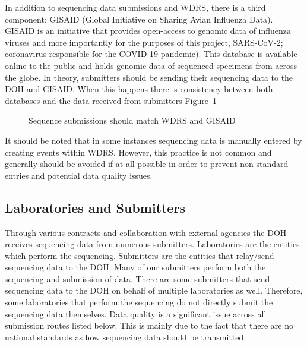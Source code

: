 \documentclass[
  letterpaper,
  DIV=11,
  numbers=noendperiod]{scrartcl}
\begin{document}
In addition to sequencing data submissions and WDRS, there is a third
component; GISAID (Global Initiative on Sharing Avian Influenza Data).
GISAID is an initiative that provides open-access to genomic data of
influenza viruses and more importantly for the purposes of this project,
SARS-CoV-2; coronavirus responsible for the COVID-19 pandemic). This
database is available online to the public and holds genomic data of
sequenced specimens from across the globe. In theory, submitters should
be sending their sequencing data to the DOH and GISAID. When this
happens there is consistency between both databases and the data
received from submitters Figure~\ref{fig-gisaid}

\begin{figure}[H]


\caption{\label{fig-gisaid}Sequence submissions should match WDRS and
GISAID}

\end{figure}%

It should be noted that in some instances sequencing data is manually
entered by creating events within WDRS. However, this practice is not
common and generally should be avoided if at all possible in order to
prevent non-standard entries and potential data quality issues.

\subsection{Laboratories and
Submitters}\label{laboratories-and-submitters}

Through various contracts and collaboration with external agencies the
DOH receives sequencing data from numerous submitters. Laboratories are
the entities which perform the sequencing. Submitters are the entities
that relay/send sequencing data to the DOH. Many of our submitters
perform both the sequencing and submission of data. There are some
submitters that send sequencing data to the DOH on behalf of multiple
laboratories as well. Therefore, some laboratories that perform the
sequencing do not directly submit the sequencing data themselves. Data
quality is a significant issue across all submission routes listed
below. This is mainly due to the fact that there are no national
standards as how sequencing data should be transmitted.
\end{document}
